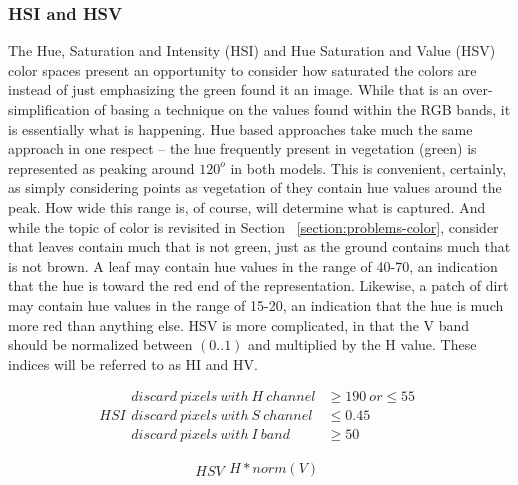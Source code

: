 \documentclass[letterpaper]{report}
\begin{document}
{\subsubsection{HSI and HSV}
The Hue, Saturation and Intensity (HSI) and Hue Saturation and Value (HSV) color spaces present an opportunity to consider how saturated the colors are instead of just emphasizing the green found it an image. While that is  an over-simplification of basing a technique on the values found within the RGB bands, it is essentially what is happening. Hue based approaches take much the same approach in one respect -- the hue frequently present in vegetation (green) is represented as peaking around $120^o$ in both models. This is convenient, certainly, as simply considering points as vegetation of they contain hue values around the peak. How wide this range is, of course, will determine what is captured. And while the topic of color is revisited in Section ~\ref{section:problems-color}, consider that leaves contain much that is not green, just as the ground contains much that is not brown. A leaf may contain hue values in the range of 40-70, an indication that the hue is toward the red end of the representation. Likewise, a patch of dirt may contain hue values in the range of 15-20, an indication that the hue is much more red than anything else. HSV is  more complicated, in that the V band should be normalized between $(0..1)$ and multiplied by the H value. These indices will be referred to as HI and HV. 

\begin{equation}
	\label{equation:hsi}
	HSI
    \begin{split}
		discard~pixels~with~H~channel &\geq 190~or \leq 55\\
		discard~pixels~with~S~channel &\leq 0.45 \\
		discard~pixels~with~I~band &\geq 50
    \end{split}
\end{equation}

\begin{equation}
	\label{equation:hsv}
	HSV
	\begin{split}
		H * norm(V) \\
	\end{split}
\end{equation}

}
\end{document}

